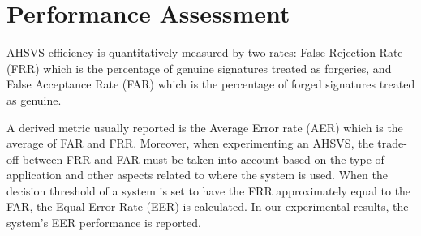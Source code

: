 \section{Performance Assessment}

AHSVS efficiency is quantitatively measured by two rates: False Rejection Rate (FRR) which is the percentage of genuine signatures treated as forgeries, and False
Acceptance Rate (FAR) which is the percentage of forged signatures treated as
genuine. 

A derived metric usually reported is the Average Error rate (AER) which is the average of FAR and FRR. Moreover, when experimenting an AHSVS, the trade-off between FRR and FAR must be taken into account based on the type of application and other aspects related to where the system is used. When the decision threshold of a system is set to have the FRR approximately equal to the FAR, the Equal Error Rate (EER) is calculated. In our experimental results, the system's EER performance is reported.

%
%



